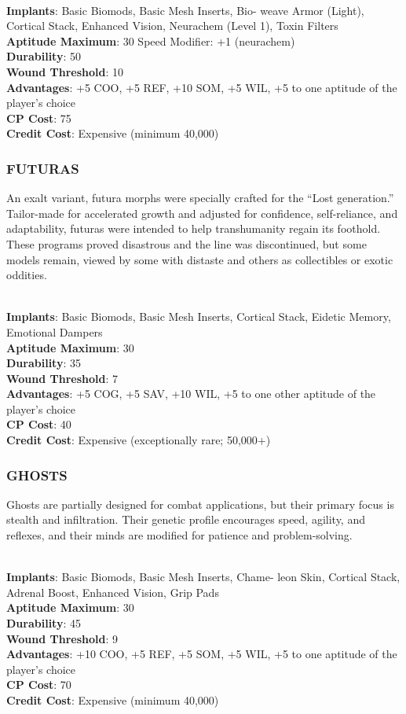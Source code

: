 \\ \textbf{Implants}: Basic Biomods, Basic Mesh Inserts, Bio-
weave Armor (Light), Cortical Stack, Enhanced
Vision, Neurachem (Level 1), Toxin Filters
\\ \textbf{Aptitude Maximum}: 30
Speed Modifier: +1 (neurachem)
\\ \textbf{Durability}: 50
\\ \textbf{Wound Threshold}: 10
\\ \textbf{Advantages}: +5 COO, +5 REF, +10 SOM, +5 WIL, +5
to one aptitude of the player’s choice
\\ \textbf{CP Cost}: 75
\\ \textbf{Credit Cost}: Expensive (minimum 40,000)

\subsubsection{FUTURAS}
An exalt variant, futura morphs were specially crafted for the “Lost
generation.” Tailor-made for accelerated growth and adjusted for confidence,
self-reliance, and adaptability, futuras were intended to help transhumanity
regain its foothold. These programs proved disastrous and the line was
discontinued, but some models remain, viewed by some with distaste and others
as collectibles or exotic oddities.

\\ \textbf{Implants}: Basic Biomods, Basic Mesh Inserts, Cortical
Stack, Eidetic Memory, Emotional Dampers
\\ \textbf{Aptitude Maximum}: 30
\\ \textbf{Durability}: 35
\\ \textbf{Wound Threshold}: 7
\\ \textbf{Advantages}: +5 COG, +5 SAV, +10 WIL, +5 to one
other aptitude of the player’s choice
\\ \textbf{CP Cost}: 40
\\ \textbf{Credit Cost}: Expensive (exceptionally rare; 50,000+)

\subsubsection{GHOSTS}
Ghosts are partially designed for combat applications, but their primary focus
is stealth and infiltration.  Their genetic profile encourages speed, agility,
and reflexes, and their minds are modified for patience and problem-solving.

\\ \textbf{Implants}: Basic Biomods, Basic Mesh Inserts, Chame-
leon Skin, Cortical Stack, Adrenal Boost, Enhanced
Vision, Grip Pads
\\ \textbf{Aptitude Maximum}: 30
\\ \textbf{Durability}: 45
\\ \textbf{Wound Threshold}: 9
\\ \textbf{Advantages}: +10 COO, +5 REF, +5 SOM, +5 WIL, +5
to one aptitude of the player’s choice
\\ \textbf{CP Cost}: 70
\\ \textbf{Credit Cost}: Expensive (minimum 40,000)

